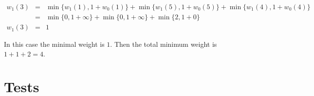 \documentclass[letterpaper,12pt]{article}
\begin{document}
$$\begin{array}{ccl}
    w_1(3) &=&  \min\{w_1(1), 1+w_0(1)\} + \min\{w_1(5), 1+w_0(5)\} + \min\{w_1(4), 1+w_0(4)\} \\
     &=& \min\{0, 1+\infty\} + \min\{0, 1+\infty\} + \min\{2, 1+0\} \\
    w_1(3) &=& 1
\end{array} $$

In this case the minimal weight is $1$. Then the total minimum weight is $1+1+2 = 4$.

\section{Tests}

\end{document}
